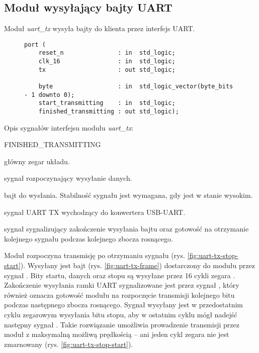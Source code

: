 \newpage
\subsection{Moduł wysyłający bajty UART}
Moduł \textit{uart\_tx} wysyła bajty do klienta przez interfejs UART.

\begin{figure}[!h]
\begin{lstlisting}[style=vhdl, captionpos=b, caption={\textit{uart\_tx} -- interfejs modułu}]
port (
	reset_n               : in  std_logic;
	clk_16                : in  std_logic;
	tx                    : out std_logic;

	byte                  : in  std_logic_vector(byte_bits - 1 downto 0);
	start_transmitting    : in  std_logic;
	finished_transmitting : out std_logic);
\end{lstlisting}
\end{figure}

Opis sygnałów interfejsu modułu \textit{uart\_tx}:
\begin{interface}{FINISHED\_TRANSMITTING}
\item[\insignal{CLK\_16}] główny zegar układu.
\item[\insignal{START\_TRANSMITTING}] sygnał rozpoczynający wysyłanie danych.
\item[\insignal{BYTE[7:0]}] bajt do wysłania. Stabilność sygnału jest wymagana, gdy  jest w stanie wysokim.
\item[\outsignal{TX}] sygnał UART TX wychodzący do konwertera USB-UART.
\item[\outsignal{FINISHED\_TRANSMITTING}] sygnał sygnalizujący zakończenie wysyłania bajtu oraz gotowość na otrzymanie kolejnego sygnału  podczas kolejnego zbocza rosnącego.
\end{interface}

Moduł rozpoczyna transmisję po otrzymaniu sygnału  (rys. \ref{fig:uart-tx-stop-start}). Wysyłany jest bajt (rys. \ref{fig:uart-tx-frame}) dostarczony do modułu przez sygnał . Bity startu, danych oraz stopu są wysyłane przez 16 cykli zegara . Zakończenie wysyłania ramki UART sygnalizowane jest przez sygnał , który również oznacza gotowość modułu na rozpoczęcie transmisji kolejnego bitu podczas następnego zbocza rosnącego. Sygnał  wysyłany jest w przedostatnim cyklu zegarowym wysyłania bitu stopu, aby w ostatnim cyklu mógł nadejść następny sygnał . Takie rozwiązanie umożliwia prowadzenie transmisji przez moduł z maksymalną możliwą prędkością -- ani jeden cykl zegara nie jest zmarnowany (rys. \ref{fig:uart-tx-stop-start}).


